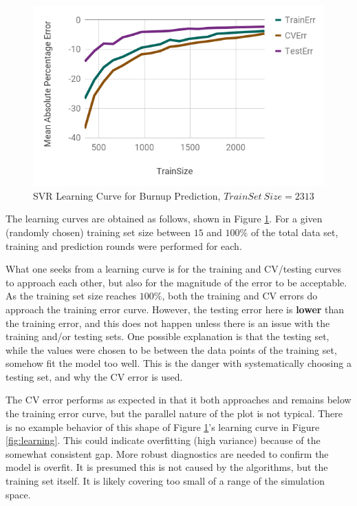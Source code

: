 \begin{figure}[!htb]
    \centering
    \includegraphics[width=\linewidth]{./chapters/demo_method/lc1.png}
    \caption{\acrshort{SVR} Learning Curve for Burnup Prediction, $TrainSet\ Size = 2313$}
    \label{fig:lc1}
\end{figure}

The learning curves are obtained as follows, shown in Figure \ref{fig:lc1}.
For a given (randomly chosen) training set size between $15$ and $100\%$ of the
total data set, training and prediction rounds were performed for each. 

What one seeks from a learning curve is for the training and \gls{CV}/testing
curves to approach each other, but also for the magnitude of the error to be
acceptable. As the training set size reaches $100\%$, both the training and
\gls{CV} errors do approach the training error curve.  However, the testing
error here is \textbf{lower} than the training error, and this does not happen
unless there is an issue with the training and/or testing sets. One possible
explanation is that the testing set, while the values were chosen to be between
the data points of the training set, somehow fit the model too well. This is
the danger with systematically choosing a testing set, and why the \gls{CV}
error is used. 

The \gls{CV} error performs as expected in that it both approaches and remains
below the training error curve, but the parallel nature of the plot is not
typical. There is no example behavior of this shape of Figure \ref{fig:lc1}'s
learning curve in Figure \ref{fig:learning}. This could indicate overfitting
(high variance) because of the somewhat consistent gap.  More robust
diagnostics are needed to confirm the model is overfit.  It is presumed this is
not caused by the algorithms, but the training set itself.  It is likely
covering too small of a range of the simulation space.

